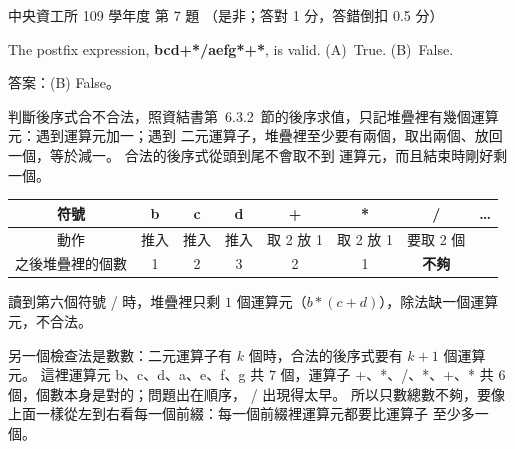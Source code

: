 \begin{pastexam}[label={px:ncu-109-dsa-07}]{中央資工所 109 學年度 第 7 題}
（是非；答對 1 分，答錯倒扣 0.5 分）

The postfix expression, \textbf{bcd+*/aefg*+*}, is valid. \qquad (A)~True. \qquad (B)~False.
\end{pastexam}

\begin{pastsoln}
答案：(B) False。

判斷後序式合不合法，照資結書第~6.3.2~節的後序求值，只記堆疊裡有幾個運算元：遇到運算元加一；遇到
二元運算子，堆疊裡至少要有兩個，取出兩個、放回一個，等於減一。 合法的後序式從頭到尾不會取不到
運算元，而且結束時剛好剩一個。
\begin{center}
\small
\begin{tabular}{cccccccc}
\toprule
符號 & b & c & d & + & * & / & \ldots \\
\midrule
動作 & 推入 & 推入 & 推入 & 取 2 放 1 & 取 2 放 1 & 要取 2 個 & \\
之後堆疊裡的個數 & 1 & 2 & 3 & 2 & 1 & \textbf{不夠} & \\
\bottomrule
\end{tabular}
\end{center}
讀到第六個符號 / 時，堆疊裡只剩 $1$ 個運算元（$b * (c + d)$），除法缺一個運算元，不合法。

另一個檢查法是數數：二元運算子有 $k$ 個時，合法的後序式要有 $k + 1$ 個運算元。 這裡運算元
b、c、d、a、e、f、g 共 $7$ 個，運算子 +、*、/、*、+、* 共 $6$ 個，個數本身是對的；問題出在順序，
/ 出現得太早。 所以只數總數不夠，要像上面一樣從左到右看每一個前綴：每一個前綴裡運算元都要比運算子
至少多一個。
\end{pastsoln}

